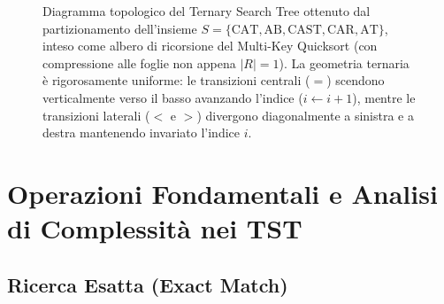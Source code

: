 \begin{figure}[H]
{%
}
\caption{Diagramma topologico del Ternary Search Tree ottenuto dal partizionamento dell'insieme $S = \{\text{CAT}, \text{AB}, \text{CAST}, \text{CAR}, \text{AT}\}$, inteso come albero di ricorsione del Multi-Key Quicksort (con compressione alle foglie non appena $|R|=1$). La geometria ternaria \`e rigorosamente uniforme: le transizioni centrali ($=$) scendono verticalmente verso il basso avanzando l'indice ($i \leftarrow i+1$), mentre le transizioni laterali ($<$ e $>$) divergono diagonalmente a sinistra e a destra mantenendo invariato l'indice $i$.}
\label{fig:tst-complete-tree}
\end{figure}

\FloatBarrier
\section{Operazioni Fondamentali e Analisi di Complessità nei TST}
\label{sec:operazioni-complessita-tst}

\FloatBarrier
\subsection{Ricerca Esatta (Exact Match)}
\label{subsec:ricerca-esatta-tst}

